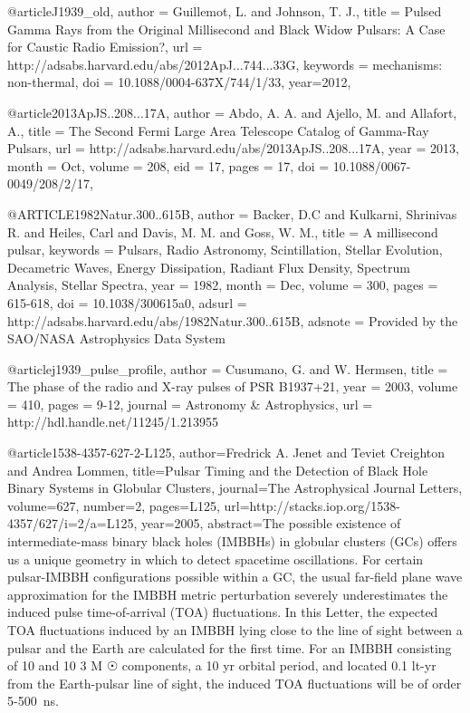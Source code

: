 {{@article{J1939_old,
  author = {Guillemot, L. and Johnson, T. J.},
  title = {Pulsed Gamma Rays from the Original Millisecond and Black Widow Pulsars: 
          A Case for Caustic Radio Emission?},
  url = {http://adsabs.harvard.edu/abs/2012ApJ...744...33G},
  keywords = {mechanisms: non-thermal},
  doi = {10.1088/0004-637X/744/1/33},
  year={2012},
}


@article{2013ApJS..208...17A,
  author = {Abdo, A. A. and  Ajello, M. and Allafort, A.},
  title = {The Second Fermi Large Area Telescope Catalog of Gamma-Ray Pulsars},
  url = {http://adsabs.harvard.edu/abs/2013ApJS..208...17A},
  year = {2013},
  month = {Oct},
  volume = {208},
  eid = {17},
  pages = {17},
  doi = {10.1088/0067-0049/208/2/17},
}


@ARTICLE{1982Natur.300..615B,
   author = {Backer, D.C and Kulkarni, Shrinivas R. and Heiles, Carl and Davis, M. M. and 
   Goss, W. M.},
    title = {A millisecond pulsar},
 keywords = {Pulsars, Radio Astronomy, Scintillation, Stellar Evolution, Decametric Waves, Energy Dissipation, Radiant Flux Density, Spectrum Analysis, Stellar Spectra},
     year = {1982},
    month = {Dec},
   volume = {300},
    pages = {615-618},
      doi = {10.1038/300615a0},
   adsurl = {http://adsabs.harvard.edu/abs/1982Natur.300..615B},
  adsnote = {Provided by the SAO/NASA Astrophysics Data System}
}


@article{j1939_pulse_profile,
    author = {Cusumano, G. and W. Hermsen},
    title = {The phase of the radio and X-ray pulses of PSR B1937+21},
    year = {2003},
    volume = {410},
    pages = {9-12}, 
    journal = {Astronomy \& Astrophysics},
    url = {http://hdl.handle.net/11245/1.213955}
}


@article{1538-4357-627-2-L125,
  author={Fredrick A. Jenet and Teviet Creighton and Andrea Lommen},
  title={Pulsar Timing and the Detection of Black Hole Binary Systems in Globular Clusters},
  journal={The Astrophysical Journal Letters},
  volume={627},
  number={2},
  pages={L125},
  url={http://stacks.iop.org/1538-4357/627/i=2/a=L125},
  year={2005},
  abstract={The possible existence of intermediate-mass binary black holes (IMBBHs) in globular clusters (GCs) offers us a unique geometry in which to detect spacetime oscillations. For certain pulsar-IMBBH configurations possible within a GC, the usual far-field plane wave approximation for the IMBBH metric perturbation severely underestimates the induced pulse time-of-arrival (TOA) fluctuations. In this Letter, the expected TOA fluctuations induced by an IMBBH lying close to the line of sight between a pulsar and the Earth are calculated for the first time. For an IMBBH consisting of 10 and 10 3 M ☉ components, a 10 yr orbital period, and located 0.1 lt-yr from the Earth-pulsar line of sight, the induced TOA fluctuations will be of order 5-500 ns.}
}
	

}}
